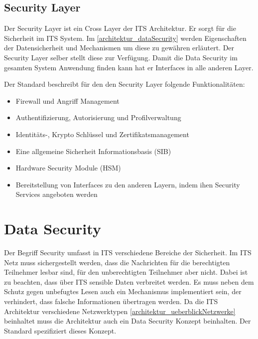 \subsection{Security Layer \label{architektur_securityLayer}}
Der Security Layer ist ein Cross Layer der \ac{ITS} Architektur. Er sorgt für die Sicherheit im \ac{ITS} System. Im \autoref{architektur_dataSecurity} werden Eigenschaften der Datensicherheit und Mechanismen um diese zu gewähren erläutert. Der Security Layer selber stellt diese  zur Verfügung. Damit die Data Security im gesamten System Anwendung finden kann hat er Interfaces in alle anderen Layer. 	

Der Standard \cite{en302665} beschreibt für den den Security Layer folgende Funktionalitäten:
\begin{itemize}
	\item Firewall und Angriff Management
	\item Authentifizierung, Autorisierung und Profilverwaltung
	\item Identitäts-, Krypto Schlüssel und Zertifikatsmanagement
	\item Eine allgemeine Sicherheit Informationsbasis (SIB)
	\item Hardware Security Module (HSM)
	\item Bereitstellung von Interfaces zu den anderen Layern, indem ihen Security Services angeboten werden
\end{itemize} 



\section{Data Security\label{architektur_dataSecurity}}
Der Begriff Security umfasst in \ac{ITS} verschiedene Bereiche der Sicherheit. Im \ac{ITS} Netz muss sichergestellt werden, dass die Nachrichten für die berechtigten Teilnehmer lesbar sind, für den unberechtigten Teilnehmer aber nicht. Dabei ist zu beachten, dass über \ac{ITS} sensible Daten verbreitet werden. Es muss neben dem Schutz gegen unbefugtes Lesen auch ein Mechanismus implementiert sein, der verhindert, dass falsche Informationen übertragen werden. Da die \ac{ITS} Architektur verschiedene Netzwerktypen \autoref{architektur_ueberblickNetzwerke} beinhaltet muss die Architektur auch ein Data Security Konzept beinhalten. Der Standard \cite{ts102940} spezifiziert dieses Konzept.  

